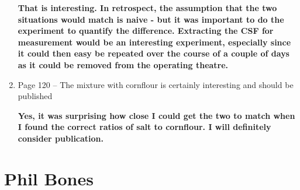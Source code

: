 \begin{enumerate}
    \textbf{\textcolor{OliveGreen}{
      That is interesting. In retrospect, the assumption that the two situations would match is naive - but it was important to do the experiment to quantify the difference.
      Extracting the CSF for measurement would be an interesting experiment, especially since it could then easy be repeated over the course of a couple of days as it could be removed from the operating theatre.
    }}

  \item Page 120 -- The mixture with cornflour is certainly interesting and should be published

    \textbf{\textcolor{OliveGreen}{
      Yes, it was surprising how close I could get the two to match when I found the correct ratios of salt to cornflour. I will definitely consider publication.
    }}
\end{enumerate}
\section*{Phil Bones}

